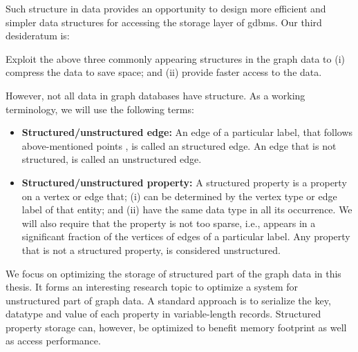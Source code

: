 \begin{guideline}
\begin{enumerate}
	\end{enumerate}
	
	Such structure in data provides an opportunity to design more efficient and simpler data structures for accessing the storage layer of \gls{gdbms}. Our third desideratum is:
	
	\begin{desideratum}
		Exploit the above three commonly appearing structures in the graph data to (i) compress the data to save space; and (ii) provide faster access to the data.
	\end{desideratum}
	
	\vspace{-10pt}
	However, not all data in graph databases have structure. As a working terminology, we will use the following terms:
	
	\begin{itemize}
		\item \textbf{Structured/unstructured edge:} An edge of a particular label, that follows above-mentioned points , is called an structured edge. An edge that is not structured, is called an unstructured edge.
		
		\item \textbf{Structured/unstructured property:} A structured property is a property on a vertex or edge that; (i) can be determined by the vertex type or edge label of that entity; and (ii) have the same data type in all its occurrence. We will also require that the property is not too sparse, i.e., appears in a significant fraction of the vertices of edges of a particular label. Any property that is not a structured property, is considered unstructured.
		
	\end{itemize}
	
	
	We focus on optimizing the storage of structured part of the graph data in this thesis. It forms an interesting research topic to optimize a system for unstructured part of graph data. A standard approach is to serialize the key, datatype and value of each property in variable-length records. Structured property storage can, however, be optimized to benefit memory footprint as well as access performance.
	
\end{guideline}

